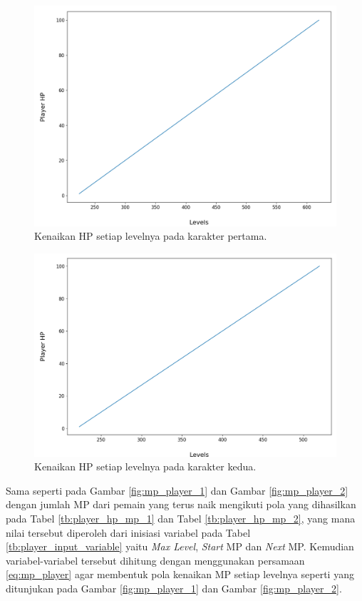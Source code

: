 \begin{figure} [!h] \centering
	\includegraphics[scale=0.42]{img/PlayerHpDistrib1.png}
	\caption{Kenaikan HP setiap levelnya pada karakter pertama.}
	\label{fig:hp_player_1}
\end{figure}

\begin{figure} [!h] \centering
	\includegraphics[scale=0.42]{img/PlayerHpDistrib2.png}
	\caption{Kenaikan HP setiap levelnya pada karakter kedua.}
	\vspace{1ex}
	\label{fig:hp_player_2}
\end{figure}

Sama seperti pada Gambar \ref{fig:mp_player_1} dan Gambar \ref{fig:mp_player_2} dengan jumlah MP dari pemain yang terus naik mengikuti pola yang dihasilkan pada Tabel \ref{tb:player_hp_mp_1} dan Tabel \ref{tb:player_hp_mp_2}, yang mana nilai tersebut diperoleh dari inisiasi variabel pada Tabel \ref{tb:player_input_variable} yaitu \textit{Max Level}, \textit{Start} MP dan \textit{Next} MP. Kemudian variabel-variabel tersebut dihitung dengan menggunakan persamaan \ref{eq:mp_player} agar membentuk pola kenaikan MP setiap levelnya seperti yang ditunjukan pada Gambar \ref{fig:mp_player_1} dan Gambar \ref{fig:mp_player_2}. 
\vspace{1ex}

